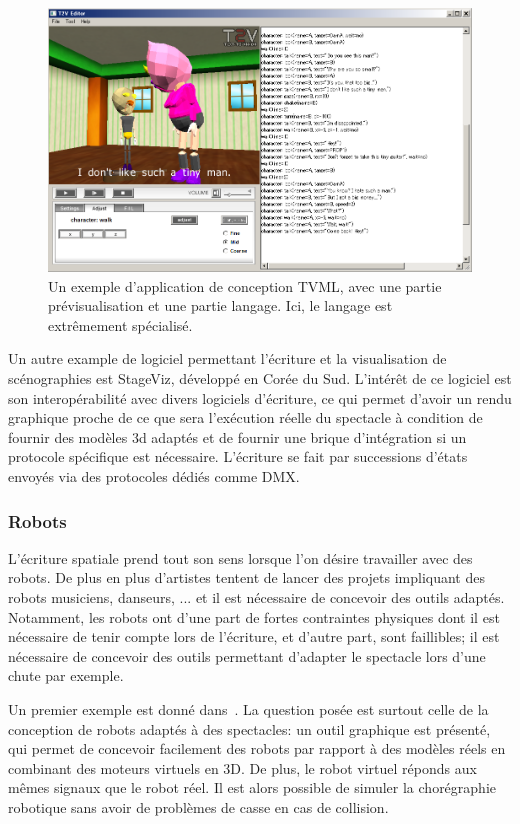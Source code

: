 \documentclass[french,12pt]{article}
\begin{document}
\begin{figure}[h]
    \centering
    \includegraphics[scale=0.35]{images/tvml.png}
    \caption{Un exemple d'application de conception TVML, avec une partie prévisualisation et une partie langage. Ici, le langage est extrêmement spécialisé.}
    \label{fig.tvml}
\end{figure}

Un autre example de logiciel permettant l'écriture et la visualisation de scénographies est StageViz\cite{lee_stageviz:_2013}, développé en Corée du Sud.
L'intérêt de ce logiciel est son interopérabilité avec divers logiciels d'écriture, ce qui permet d'avoir un rendu graphique proche de 
ce que sera l'exécution réelle du spectacle à condition de fournir des modèles 3d adaptés et de fournir une brique d'intégration si un protocole spécifique est nécessaire. 
L'écriture se fait par successions d'états envoyés via des protocoles dédiés comme DMX.

\subsubsection{Robots}
L'écriture spatiale prend tout son sens lorsque l'on désire travailler avec des robots. De plus en plus d'artistes tentent de lancer des projets impliquant des robots musiciens, danseurs, ... et il est nécessaire de concevoir des outils adaptés. 
Notamment, les robots ont d'une part de fortes contraintes physiques dont il est nécessaire de tenir compte lors de l'écriture, et d'autre part, sont faillibles; il est nécessaire de concevoir des outils permettant d'adapter le spectacle lors d'une chute par exemple.

Un premier exemple est donné dans~\cite{lee_visualization_2013}. La question posée est surtout celle de la conception de robots adaptés à des spectacles:  un outil graphique est présenté, qui permet de concevoir facilement des robots par rapport à des modèles réels en combinant des moteurs virtuels en 3D. De plus, le robot virtuel réponds aux mêmes signaux que le robot réel. Il est alors possible de simuler la chorégraphie robotique sans avoir de problèmes de casse en cas de collision.
\end{document}
